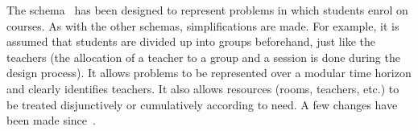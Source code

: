 The \UTP{} schema~\cite{2022_barichard_PATAT} has been designed to represent problems in which students enrol on courses. As with the other schemas, simplifications are made. For example, it is assumed that students are divided up into groups beforehand, just like the teachers (the allocation of a teacher to a group and a session is done during the design process). It allows problems to be represented over a modular time horizon and clearly identifies teachers. It also allows resources (rooms, teachers, etc.) to be treated disjunctively or cumulatively according to need. %
A few changes have been made since~\cite{2022_barichard_PATAT}. %
